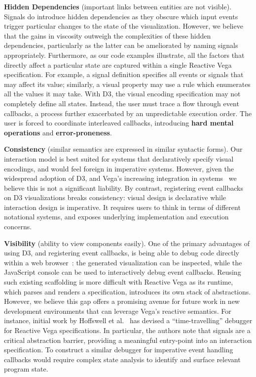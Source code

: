 \textbf{Hidden Dependencies} (important links between entities are not visible).
Signals do introduce hidden dependencies as they obscure which input events
trigger particular changes to the state of the visualization. However, we
believe that the gains in viscosity outweigh the complexities of these hidden
dependencies, particularly as the latter can be ameliorated by naming signals
appropriately. Furthermore, as our code examples illustrate, all the factors
that directly affect a particular state are captured within a single Reactive
Vega specification. For example, a signal definition specifies all events or
signals that may affect its value; similarly, a visual property may use a rule
which enumerates all the values it may take. With D3, the visual encoding
specification may not completely define all states. Instead, the user must trace
a flow through event callbacks, a process further exacerbated by an
unpredictable execution order. The user is forced to coordinate interleaved
callbacks, introducing \textbf{hard mental operations} and
\textbf{error-proneness}.

\textbf{Consistency} (similar semantics are expressed in similar syntactic
forms). Our interaction model is best suited for systems that declaratively
specify visual encodings, and would feel foreign in imperative systems. However,
given the widespread adoption of D3, and Vega's increasing integration in
systems~\cite{lyra, voyager, wikipedia:graph} we believe this is not a
significant liability. By contrast, registering event callbacks on D3
visualizations breaks consistency: visual design is declarative while
interaction design is imperative. It requires users to think in terms of
different notational systems, and exposes underlying implementation and
execution concerns.

\textbf{Visibility} (ability to view components easily). One of the primary
advantages of using D3, and registering event callbacks, is being able to debug
code directly within a web browser~\cite{bostock:d3}: the generated
visualization can be inspected, while the JavaScript console can be used to
interactively debug event callbacks. Reusing such existing scaffolding is more
difficult with Reactive Vega as its runtime, which parses and renders a
specification, introduces its own stack of abstractions. However, we believe
this gap offers a promising avenue for future work in new development
environments that can leverage Vega's reactive semantics. For instance, initial
work by Hoffswell et al.~\cite{hoffswell:debugging} has devised a
``time-travelling'' debugger for Reactive Vega specifications. In particular,
the authors note that signals are a critical abstraction barrier, providing a
meaningful entry-point into an interaction specification. To construct a similar
debugger for imperative event handling callbacks would require complex state
analysis to identify and surface relevant program state.


